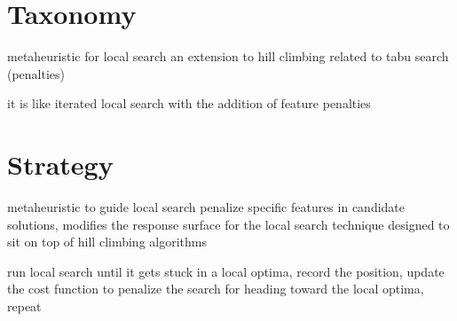 \documentclass[a4paper, 11pt]{article}
\begin{document}
\section{Taxonomy}
\label{sec:taxonomy}
metaheuristic for local search
an extension to hill climbing
related to tabu search (penalties)

it is like iterated local search with the addition of feature penalties 


\section{Strategy}
\label{sec:strategy}
metaheuristic to guide local search
penalize specific features in candidate solutions, modifies the response surface for the local search technique
designed to sit on top of hill climbing algorithms

run local search until it gets stuck in a local optima, record the position, update the cost function to penalize the search for heading toward the local optima, repeat


\end{document}
